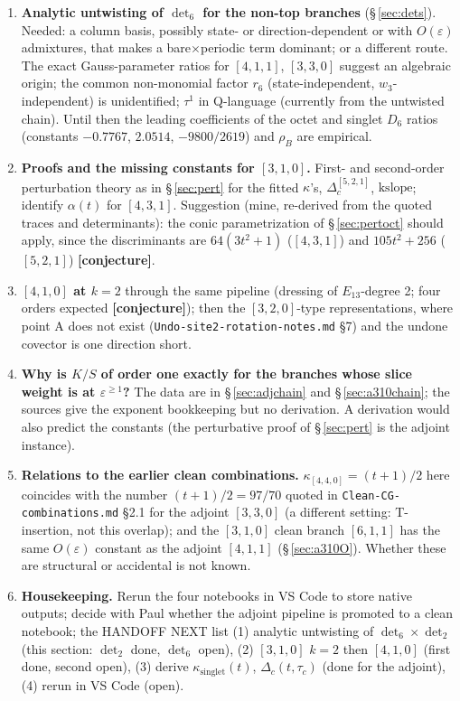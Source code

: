 \documentclass[10pt]{article}
\newcommand{\nb}[1]{\texttt{#1}}
\begin{document}
\begin{enumerate}\setlength{\itemsep}{1pt}
\item \textbf{Analytic untwisting of $\det_6$ for the non-top branches} (\S\,\ref{sec:dets}). Needed: a column basis, possibly state- or direction-dependent or with $O(\varepsilon)$ admixtures, that makes a bare$\times$periodic term dominant; or a different route. The exact Gauss-parameter ratios for $[4,1,1]$, $[3,3,0]$ suggest an algebraic origin; the common non-monomial factor $r_6$ (state-independent, $w_3$-independent) is unidentified; $\tau^1$ in Q-language (currently from the untwisted chain). Until then the leading coefficients of the octet and singlet $D_6$ ratios (constants $-0.7767$, $2.0514$, $-9800/2619$) and $\rho_B$ are empirical.
\item \textbf{Proofs and the missing constants for $[3,1,0]$.} First- and second-order perturbation theory as in \S\,\ref{sec:pert} for the fitted $\kappa$'s, $\Delta_c^{[5,2,1]}$, $\mathrm{kslope}$; identify $\alpha(t)$ for $[4,3,1]$. Suggestion (mine, re-derived from the quoted traces and determinants): the conic parametrization of \S\,\ref{sec:pertoct} should apply, since the discriminants are $64(3t^2+1)$ ($[4,3,1]$) and $105t^2+256$ ($[5,2,1]$) \textbf{[conjecture]}.
\item \textbf{$[4,1,0]$ at $k=2$} through the same pipeline (dressing of $E_{13}$-degree 2; four orders expected \textbf{[conjecture]}); then the $[3,2,0]$-type representations, where point A does not exist (\nb{Undo-\allowbreak{}site2-\allowbreak{}rotation-\allowbreak{}notes.\allowbreak{}md} \S{}7) and the undone covector is one direction short.
\item \textbf{Why is $K/S$ of order one exactly for the branches whose slice weight is at $\varepsilon^{\ge1}$?} The data are in \S\,\ref{sec:adjchain} and \S\,\ref{sec:a310chain}; the sources give the exponent bookkeeping but no derivation. A derivation would also predict the constants (the perturbative proof of \S\,\ref{sec:pert} is the adjoint instance).
\item \textbf{Relations to the earlier clean combinations.} $\kappa_{[4,4,0]}=(t+1)/2$ here coincides with the number $(t+1)/2=97/70$ quoted in \nb{Clean-\allowbreak{}CG-\allowbreak{}combinations.\allowbreak{}md} \S{}2.1 for the adjoint $[3,3,0]$ (a different setting: T-insertion, not this overlap); and the $[3,1,0]$ clean branch $[6,1,1]$ has the same $O(\varepsilon)$ constant as the adjoint $[4,1,1]$ (\S\,\ref{sec:a310O}). Whether these are structural or accidental is not known.
\item \textbf{Housekeeping.} Rerun the four notebooks in VS Code to store native outputs; decide with Paul whether the adjoint pipeline is promoted to a clean notebook; the HANDOFF NEXT list (1) analytic untwisting of $\det_6\times\det_2$ (this section: $\det_2$ done, $\det_6$ open), (2) $[3,1,0]$ $k=2$ then $[4,1,0]$ (first done, second open), (3) derive $\kappa_{\mathrm{singlet}}(t)$, $\Delta_c(t,\tau_c)$ (done for the adjoint), (4) rerun in VS Code (open).
\end{enumerate}
\end{document}
